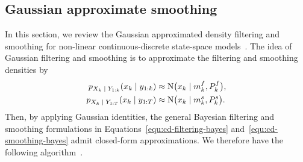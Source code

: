 \subsection{Gaussian approximate smoothing}
\label{sec:gaussian-filter-smoother}
In this section, we review the Gaussian approximated density filtering and smoothing for non-linear continuous-discrete state-space models~\citep{Kazufumi2000, SimoGFS2013}. The idea of Gaussian filtering and smoothing is to approximate the filtering and smoothing densities by
%
\begin{equation}
	\begin{split}
		p_{X_k {\;|\;} Y_{1:k}}(x_k {\;|\;} y_{1:k}) &\approx \mathrm{N}\big(x_k {\;|\;} m^f_k, P^f_k\big), \\
		p_{X_k {\;|\;} Y_{1:T}}(x_k {\;|\;} y_{1:T}) &\approx \mathrm{N}\big(x_k {\;|\;} m^s_k, P^s_k\big).
	\end{split}
	\label{equ:gfs-posteriors}
\end{equation}
% 
Then, by applying Gaussian identities, the general Bayesian filtering and smoothing formulations in Equations~\eqref{equ:cd-filtering-bayes} and~\eqref{equ:cd-smoothing-bayes} admit closed-form approximations. We therefore have the following algorithm~\citep[cf.][Chapter 10]{Sarkka2019}.
